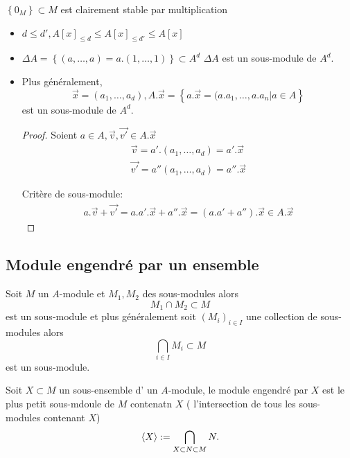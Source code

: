 \documentclass[../main.tex]{subfiles}
\begin{document}
\begin{exemple}
$ \left\{ 0_M \right\} \subset M$ est clairement stable par multiplication
\begin{itemize}
	\item $d \leq d', A[x]_{\leq d} \leq A[x]_{\leq d'} \leq A[x]$ 
	\item $\Delta A = \left\{ ( a,\ldots, a)= a.(1,\ldots,1) \right\} \subset A^{d}$ 
		$\Delta A$ est un sous-module de $A^{d}$.
		
	\item Plus généralement,
		\[ 
			\vec{x}= ( a_1,\ldots,a_d), A.\vec{x} = \left\{ a.\vec{x}=(a.a_1,\ldots,a.a_n | a \in A \right\} 
		\]
		est un sous-module de $A^{d}$.
		
	\begin{proof}
	Soient $a\in A, \vec{v},\vec{v'} \in A.\vec{x}$
	\begin{align*}
	\vec{v} = a'.(a_1,\ldots,a_d)=a'.\vec{x}\\
	\vec{v'}=a'' ( a_1,\ldots,a_d) = a''.\vec{x}
	\end{align*}
	
	Critère de sous-module:
	\begin{align*}
		a.\vec{v} + \vec{v'} = a.a'.\vec{x} + a''.\vec{x} = ( a.a'+a'').\vec{x} \in A.\vec{x}
	\end{align*}
	
	\end{proof}
	
\end{itemize}

\end{exemple}
\subsection{Module engendré par un ensemble}
\begin{propo}
Soit $M$ un $A$-module et $M_1, M_2$ des sous-modules alors
\[ 
M_1\cap M_2 \subset M
\]
est un sous-module et plus généralement soit $(M_i)_{i\in I } $ une collection de sous-modules alors
\[ 
\bigcap_{i\in I} M_i \subset M
\]
est un sous-module.
\end{propo}
\begin{defn}
	Soit $X\subset M$ un sous-ensemble d' un $A$-module, le module engendré par $X$ est le plus petit sous-mdoule de $M$ contenatn $X$ ( l'intersection de tous les sous-modules contenant $X$)
	\[ 
		\left\langle X\right\rangle := \bigcap_{X \subset N \subset M} N.
	\]
	
\end{defn}
\end{document}

